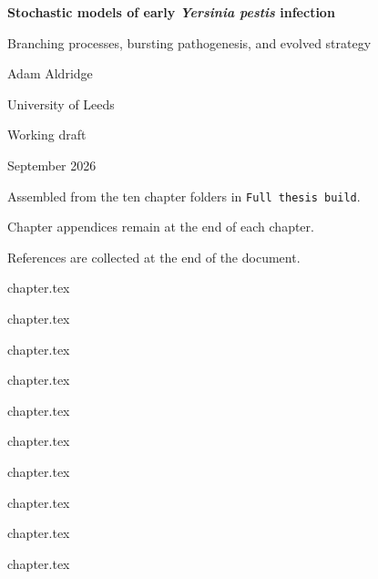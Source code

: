 \documentclass[11pt,a4paper]{report}
\newcommand{\stitchchapter}[2]{%
  \clearpage
  \graphicspath{{chapters/#1/}{chapters/#1/figures/}{chapters/#1/pictures/}}%
  \begingroup
  {#2}%
  \endgroup
  \FloatBarrier
}
\begin{document}
\hypersetup{pageanchor=false}
\begin{titlepage}
\centering
\vspace*{3.2cm}
{\LARGE\bfseries Stochastic models of early \textit{Yersinia pestis} infection\par}
\vspace{10pt}
{\large Branching processes, bursting pathogenesis, and evolved strategy\par}
\vspace{2.4cm}
{\large Adam Aldridge\par}
\vspace{6pt}
{University of Leeds\par}
\vspace{2.2cm}
{\large Working draft\par}
\vspace{4pt}
{September 2026\par}
\vfill
{\small Assembled from the ten chapter folders in \texttt{Full thesis build}.\par
Chapter appendices remain at the end of each chapter.\par
References are collected at the end of the document.\par}
\vspace*{1.2cm}
\end{titlepage}
\hypersetup{pageanchor=true}

\begingroup
\setlength{\parskip}{0pt}
\tableofcontents
\endgroup
\clearpage

\stitchchapter{ch01}{chapter.tex}

\stitchchapter{ch02}{chapter.tex}

\stitchchapter{ch03}{chapter.tex}

\stitchchapter{ch04}{chapter.tex}

\stitchchapter{ch05}{chapter.tex}

\clearpage
\graphicspath{{chapters/ch06/}{chapters/ch06/figures/}}

\begingroup

{chapter.tex}
\endgroup

\FloatBarrier

\stitchchapter{ch07}{chapter.tex}

\stitchchapter{ch08}{chapter.tex}

\stitchchapter{ch09}{chapter.tex}

\stitchchapter{ch10}{chapter.tex}

\clearpage
{}
{}
\begingroup
\small


\endgroup
\end{document}

